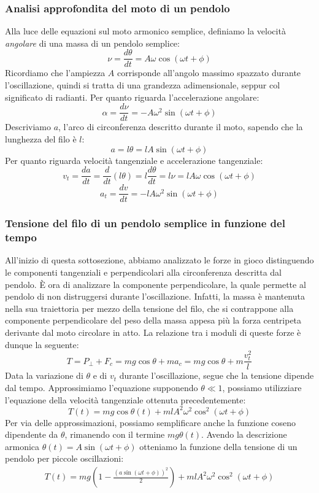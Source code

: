 \subsubsection*{Analisi approfondita del moto di un pendolo}
Alla luce delle equazioni sul moto armonico semplice, definiamo la
velocità \textit{angolare} di una massa di un pendolo semplice:
\[ \nu = \frac{d\theta}{dt} = A\omega\cos(\omega t + \phi) \]
Ricordiamo che l'ampiezza $A$ corrisponde all'angolo massimo spazzato
durante l'oscillazione, quindi si tratta di una grandezza adimensionale,
seppur col significato di radianti. Per quanto riguarda l'accelerazione
angolare:
\[ \alpha = \frac{d\nu}{dt} = -A\omega^2\sin(\omega t + \phi) \]
Descriviamo $a$, l'arco di circonferenza descritto durante il moto,
sapendo che la lunghezza del filo è $l$:
\[ a = l\theta = lA\sin(\omega t + \phi) \]
Per quanto riguarda velocità tangenziale e accelerazione tangenziale:
\[ v_t = \frac{da}{dt} = \frac{d}{dt}(l\theta) = l\frac{d\theta}{dt} = l\nu = lA\omega\cos(\omega t + \phi) \]
\[ a_t = \frac{dv}{dt} = -lA\omega^2\sin(\omega t + \phi) \]


\subsubsection*{Tensione del filo di un pendolo semplice in funzione del tempo}
All'inizio di questa sottosezione, abbiamo analizzato le forze in gioco
distinguendo le componenti tangenziali e perpendicolari alla circonferenza
descritta dal pendolo. È ora di analizzare la componente perpendicolare,
la quale permette al pendolo di non distruggersi durante l'oscillazione.
Infatti, la massa è mantenuta nella sua traiettoria per mezzo della tensione
del filo, che si contrappone alla componente perpendicolare del peso della
massa appesa più la forza centripeta derivante dal moto circolare in atto.
La relazione tra i moduli di queste forze è dunque la seguente:
\[T = P_\perp + F_c = mg\cos\theta + ma_c = mg\cos\theta + m\frac{v_t^2}{l} \]
Data la variazione di $\theta$ e di $v_t$ durante l'oscillazione, segue
che la tensione dipende dal tempo. Approssimiamo l'equazione supponendo
$\theta\ll1$, possiamo utilizziare
l'equazione della velocità tangenziale ottenuta precedentemente:
\[ T(t) = mg\cos\theta(t) + mlA^2\omega^2\cos^2(\omega t + \phi) \]
Per via delle approssimazioni, possiamo semplificare anche la funzione coseno
dipendente da $\theta$, rimanendo con il termine $mg\theta(t)$. Avendo la
descrizione armonica $\theta(t) = A\sin(\omega t + \phi)$ otteniamo la funzione
della tensione di un pendolo per piccole oscillazioni:
\begin{align}
    T(t) = mg\left(1 - \frac{(a\sin(\omega t + \phi))^2}{2}\right) + mlA^2\omega^2\cos^2(\omega t + \phi)
\end{align}